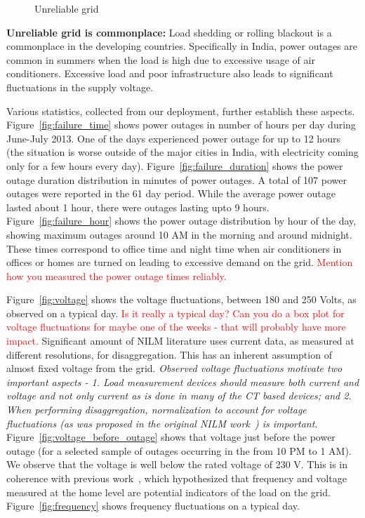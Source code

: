 \documentclass[10pt]{sensys-proc}
\newcommand{\redcolor}[1]{\textcolor{red}{#1}}
\newcommand{\figref}[1]{Figure~\ref{#1}}
\begin{document}
\begin{figure}[t!]
     \vspace{-3mm}
   
    \caption{Unreliable grid}

    \label{fig:unreliable}

\end{figure}

\noindent \textbf{Unreliable grid is commonplace:} Load shedding or rolling blackout is a commonplace in the developing countries. %
Specifically in India, power outages are common in summers when the load is high due to excessive usage of air conditioners. Excessive load and poor infrastructure also leads to significant fluctuations in the supply voltage. %

Various statistics, collected from our deployment, further establish these aspects. \figref{fig:failure_time} shows power outages in number of hours per day during June-July 2013. One of the days experienced power outage for up to 12 hours (the situation is worse outside of the major cities in India, with electricity coming only for a few hours every day). \figref{fig:failure_duration} shows the power outage duration distribution in minutes of power outages. A total of 107 power outages were reported in the 61 day period. While the average power outage lasted about 1 hour, there were outages lasting upto 9 hours. \figref{fig:failure_hour} shows the power outage distribution by hour of the day, showing maximum outages around 10 AM in the morning and around midnight. These times correspond to office time and night time when air conditioners in offices or homes are turned on leading to excessive demand on the grid. \redcolor{Mention how you measured the power outage times reliably.}

\figref{fig:voltage} shows the voltage fluctuations, between 180 and 250 Volts, as observed on a typical day. \redcolor{Is it really a typical day? Can you do a box plot for voltage fluctuations for maybe one of the weeks - that will probably have more impact.} Significant amount of NILM literature uses current data, as measured at different resolutions, for disaggregation. This has an inherent assumption of almost fixed voltage from the grid. \emph{Observed voltage fluctuations motivate two important aspects - 1. Load measurement devices should measure both current and voltage and not only current as is done in many of the CT based devices; and 2. When performing disaggregation, normalization to account for voltage fluctuations (as was proposed in the original NILM work~\cite{hart}) is important.}
\figref{fig:voltage_before_outage} shows that voltage just before the power outage (for a selected sample of outages occurring in the  from 10 PM to 1 AM). We observe that the voltage is well below the rated voltage of 230 V. This is in coherence with previous work~\cite{nplug}, which hypothesized that frequency and voltage measured at the home level are potential indicators of the load on the grid. \figref{fig:frequency} shows frequency fluctuations on a typical day.
\end{document}
